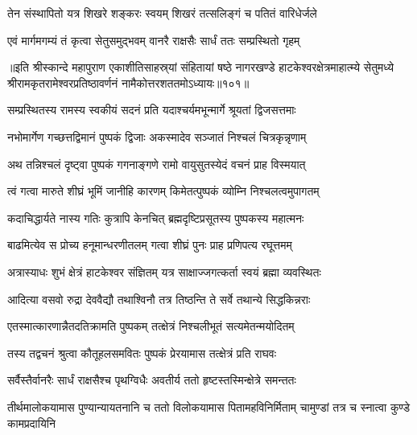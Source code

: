 \twolineshloka
{तेन संस्थापितो यत्र शिखरे शङ्करः स्वयम्}
{शिखरं तत्सलिङ्गं च पतितं वारिधेर्जले}%

\twolineshloka
{एवं मार्गमगम्यं तं कृत्वा सेतुसमुद्भवम्}
{वानरै राक्षसैः सार्धं ततः सम्प्रस्थितो गृहम्}%

॥इति श्रीस्कान्दे महापुराण एकाशीतिसाहस्र्यां संहितायां षष्ठे नागरखण्डे हाटकेश्वरक्षेत्रमाहात्म्ये सेतुमध्ये श्रीरामकृतरामेश्वरप्रतिष्ठावर्णनं नामैकोत्तरशततमोऽध्यायः॥१०१॥

\resetShloka


\twolineshloka
{सम्प्रस्थितस्य रामस्य स्वकीयं सदनं प्रति}
{यदाश्चर्यमभून्मार्गे श्रूयतां द्विजसत्तमाः}%

\twolineshloka
{नभोमार्गेण गच्छत्तद्विमानं पुष्पकं द्विजाः}
{अकस्मादेव सञ्जातं निश्चलं चित्रकृन्नृणाम्}%

\twolineshloka
{अथ तन्निश्चलं दृष्ट्वा पुष्पकं गगनाङ्गणे}
{रामो वायुसुतस्येदं वचनं प्राह विस्मयात्}%

\twolineshloka
{त्वं गत्वा मारुते शीघ्रं भूमिं जानीहि कारणम्}
{किमेतत्पुष्पकं व्योम्नि निश्चलत्वमुपागतम्}%

\twolineshloka
{कदाचिद्धार्यते नास्य गतिः कुत्रापि केनचित्}
{ब्रह्मदृष्टिप्रसूतस्य पुष्पकस्य महात्मनः}%

\twolineshloka
{बाढमित्येव स प्रोच्य हनूमान्धरणीतलम्}
{गत्वा शीघ्रं पुनः प्राह प्रणिपत्य रघूत्तमम्}%

\twolineshloka
{अत्रास्याधः शुभं क्षेत्रं हाटकेश्वर संज्ञितम्}
{यत्र साक्षाज्जगत्कर्ता स्वयं ब्रह्मा व्यवस्थितः}%

\twolineshloka
{आदित्या वसवो रुद्रा देववैद्यौ तथाश्विनौ}
{तत्र तिष्ठन्ति ते सर्वे तथान्ये सिद्धकिन्नराः}%

\twolineshloka
{एतस्मात्कारणान्नैतदतिक्रामति पुष्पकम्}
{तत्क्षेत्रं निश्चलीभूतं सत्यमेतन्मयोदितम्}%


\twolineshloka
{तस्य तद्वचनं श्रुत्वा कौतूहलसमवितः} 
{पुष्पकं प्रेरयामास तत्क्षेत्रं प्रति राघवः} 

\twolineshloka
{सर्वैस्तैर्वानरैः सार्धं राक्षसैश्च पृथग्विधैः}
{अवतीर्य ततो हृष्टस्तस्मिन्क्षेत्रे समन्ततः}%

\threelineshloka
{तीर्थमालोकयामास पुण्यान्यायतनानि च}
{ततो विलोकयामास पितामहविनिर्मिताम्}
{चामुण्डां तत्र च स्नात्वा कुण्डे कामप्रदायिनि}%


